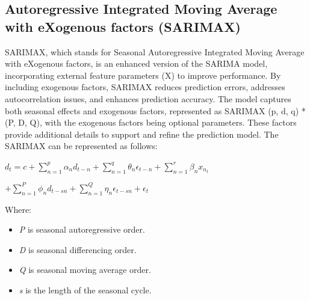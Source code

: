 \documentclass{ieeeojies}
\begin{document}
\subsection{Autoregressive Integrated Moving Average with eXogenous factors (SARIMAX)}
SARIMAX, which stands for Seasonal Autoregressive Integrated Moving Average with eXogenous factors, is an enhanced version of the SARIMA model, incorporating external feature parameters (X) to improve performance. By including exogenous factors, SARIMAX reduces prediction errors, addresses autocorrelation issues, and enhances prediction accuracy. The model captures both seasonal effects and exogenous factors, represented as SARIMAX (p, d, q) * (P, D, Q), with the exogenous factors being optional parameters. These factors provide additional details to support and refine the prediction model. The SARIMAX can be represented as follows:
\newline \centerline{$d_{t} = c + \displaystyle \sum_{n=1}^{p}\alpha_{n}d_{t-n} + \displaystyle \sum_{n=1}^{q}\theta_{n}\epsilon_{t-n} + \displaystyle \sum_{n=1}^{r}\beta_{n}x_{n_{t}}$}
\newline \centerline{$+ \displaystyle \sum_{n=1}^{P}\phi_{n}d_{t-sn} + \displaystyle \sum_{n=1}^{Q}\eta_{n}\epsilon_{t-sn} + \epsilon_{t}$}
\newline Where:
\begin{itemize}
	\item \textit{P} is seasonal autoregressive order.
	\item \textit{D} is seasonal differencing order.
	\item \textit{Q} is seasonal moving average order.
	\item \textit{s} is the length of the seasonal cycle.
\end{itemize}
\end{document}
